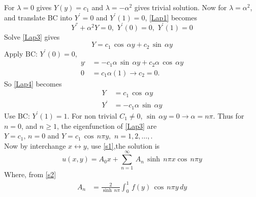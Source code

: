 For $\lambda=0$ gives $Y(y)=c_1$ and $\lambda=-\alpha^2$ gives trivial solution. Now for $\lambda=\alpha^2$, and translate BC into $Y^{'}=0$ and $Y^{'}(1)=0$, \eqref{Lap1} becomes 
\begin{equation}
Y^{''}+\alpha^2 Y=0,\,\,Y^{'}(0)=0,\,\,Y^{'}(1)=0\label{Lap3}
\end{equation}
Solve \eqref{Lap3} gives
\begin{equation}
Y=c_1\,\cos\,\alpha y+c_2\,\sin\,\alpha y\label{Lap4}
\end{equation}
Apply BC: $Y^{'}(0)=0$,
\begin{align*}
y^{,}&=-c_1\alpha\,\sin\,\alpha y+c_2\alpha\,\cos\,\alpha y\\
0&=c_1\alpha(1)\to c_2=0.
\end{align*}
So \eqref{Lap4} becomes
\begin{align}
Y&=c_1\,\cos\,\alpha y\\
Y^{'}&=-c_1\alpha\,\sin\,\alpha y
\end{align}
Use BC: $Y^{'}(1)=1$. For non trivial $C_1\neq 0$, $\sin\,\alpha y=0\to \alpha=n\pi$. Thus for $n=0$, and $n\ge 1$, the eigenfunction  of \eqref{Lap3} are\\

$Y=c_1,\,n=0$ and $Y=c_1\,\cos\,n\pi y,\,\,n=1,2,\ldots,$.\\
Now by interchange $x\leftrightarrow y$, use \eqref{s1},the solution is
\begin{equation}
u(x,y)=A_0x+\sum_{n=1}^\infty\,A_n\,\sinh\,n\pi x\cos\,n\pi y
\end{equation}
Where, from \eqref{s2}
\begin{align*}
A_n&=\frac{2}{\sinh\,n\pi}\int_0^1\,f(y)\,\cos\,n\pi y\,dy
\end{align*}
